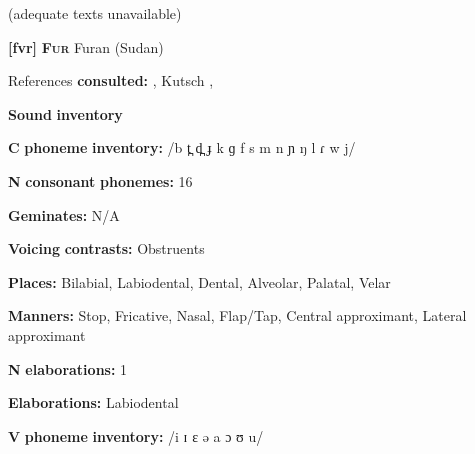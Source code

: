 \documentclass[output=paper]{langsci/langscibook}
\begin{document}
\begin{styleBody}
(adequate texts unavailable)
\end{styleBody}

\begin{styleBody}
\textbf{[fvr]}   \textbf{\textsc{Fur}}  Furan (Sudan)
\end{styleBody}

\begin{styleBody}
References \textbf{consulted:} \citet{Jakobi1990}, Kutsch \citet{LojengaWaag2004}, \citet{Noel2008}
\end{styleBody}

\begin{styleBody}
\textbf{Sound} \textbf{inventory}
\end{styleBody}

\begin{styleBody}
\textbf{C} \textbf{phoneme} \textbf{inventory:} /b t̪ d̪ ɟ k ɡ f s m n ɲ ŋ l ɾ w j/
\end{styleBody}

\begin{styleBody}
\textbf{N} \textbf{consonant} \textbf{phonemes:} 16
\end{styleBody}

\begin{styleBody}
\textbf{Geminates:} N/A
\end{styleBody}

\begin{styleBody}
\textbf{Voicing} \textbf{contrasts:} Obstruents
\end{styleBody}

\begin{styleBody}
\textbf{Places:} Bilabial, Labiodental, Dental, Alveolar, Palatal, Velar
\end{styleBody}

\begin{styleBody}
\textbf{Manners:} Stop, Fricative, Nasal, Flap/Tap, Central approximant, Lateral approximant
\end{styleBody}

\begin{styleBody}
\textbf{N} \textbf{elaborations:} 1
\end{styleBody}

\begin{styleBody}
\textbf{Elaborations:} Labiodental
\end{styleBody}

\begin{styleBody}
\textbf{V} \textbf{phoneme} \textbf{inventory:} /i ɪ ɛ ə a ɔ ʊ u/
\end{styleBody}
\end{document}
